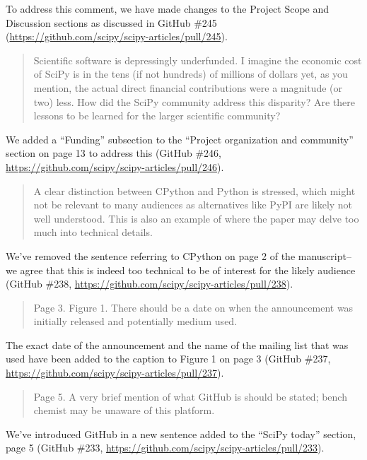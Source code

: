 \documentclass[10pt,stdletter,dateno]{newlfm}
\begin{document}
\begin{newlfm}
To address this comment, we have made changes to the Project Scope and Discussion sections as discussed in GitHub \#245 (\url{https://github.com/scipy/scipy-articles/pull/245}).

\begin{quote}
Scientific software is depressingly underfunded. I imagine the economic cost of SciPy is in the tens (if not hundreds) of millions of dollars yet, as you mention, the actual direct financial contributions were a magnitude (or two) less. How did the SciPy community address this disparity? Are there lessons to be learned for the larger scientific community?
\end{quote}

We added a ``Funding'' subsection to the ``Project organization and community'' section on page 13 to address this (GitHub \#246, \url{https://github.com/scipy/scipy-articles/pull/246}). 

\begin{quote}
A clear distinction between CPython and Python is stressed, which might not be relevant to many audiences as alternatives like PyPI are likely not well understood. This is also an example of where the paper may delve too much into technical details.
\end{quote}

We've removed the sentence referring to CPython on page 2 of the manuscript--we agree that this is indeed too technical to be of interest for the likely audience (GitHub \#238, \url{https://github.com/scipy/scipy-articles/pull/238}). 

\begin{quote}
Page 3. Figure 1. There should be a date on when the announcement was initially released and potentially medium used.
\end{quote}

The exact date of the announcement and the name of the mailing list that was used have been added to the caption to Figure 1 on page 3 (GitHub \#237, \url{https://github.com/scipy/scipy-articles/pull/237}). 

\begin{quote}
Page 5. A very brief mention of what GitHub is should be stated; bench chemist may be unaware of this platform.
\end{quote}

We've introduced GitHub in a new sentence added to the ``SciPy today'' section, page 5 (GitHub \#233, \url{https://github.com/scipy/scipy-articles/pull/233}). 


\end{newlfm}
\end{document}
